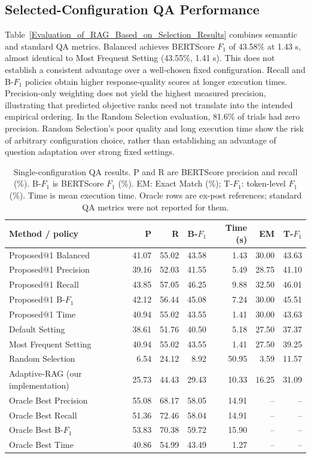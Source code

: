 \subsection{Selected-Configuration QA Performance} \label{sec5.2}
Table~\ref{Evaluation_of_RAG_Based_on_Selection_Results} combines semantic and standard QA metrics. Balanced achieves BERTScore $F_1$ of 43.58\% at 1.43 s, almost identical to Most Frequent Setting (43.55\%, 1.41 s). This does not establish a consistent advantage over a well-chosen fixed configuration. Recall and B-$F_1$ policies obtain higher response-quality scores at longer execution times. Precision-only weighting does not yield the highest measured precision, illustrating that predicted objective ranks need not translate into the intended empirical ordering. In the Random Selection evaluation, 81.6\% of trials had zero precision. Random Selection's poor quality and long execution time show the risk of arbitrary configuration choice, rather than establishing an advantage of question adaptation over strong fixed settings.

\begin{table}[tb]
\centering\small
\caption{Single-configuration QA results. P and R are BERTScore precision and recall (\%). B-$F_1$ is BERTScore $F_1$ (\%). EM: Exact Match (\%); T-$F_1$: token-level $F_1$ (\%). Time is mean execution time. Oracle rows are ex-post references; standard QA metrics were not reported for them.}
\label{Evaluation_of_RAG_Based_on_Selection_Results}
\label{Evaluation_of_RAG_Based_on_Standard_Metrics}
\begin{tabular}{lrrrrrr}
\toprule
Method / policy & P & R & B-$F_1$ & Time (s) & EM & T-$F_1$ \\
\midrule
Proposed@1 Balanced & 41.07 & 55.02 & 43.58 & 1.43 & 30.00 & 43.63 \\
Proposed@1 Precision & 39.16 & 52.03 & 41.55 & 5.49 & 28.75 & 41.10 \\
Proposed@1 Recall & 43.85 & 57.05 & 46.25 & 9.88 & 32.50 & 46.01 \\
Proposed@1 B-$F_1$ & 42.12 & 56.44 & 45.08 & 7.24 & 30.00 & 45.51 \\
Proposed@1 Time & 40.94 & 55.02 & 43.55 & 1.41 & 30.00 & 43.63 \\
\midrule
Default Setting & 38.61 & 51.76 & 40.50 & 5.18 & 27.50 & 37.37 \\
Most Frequent Setting & 40.94 & 55.02 & 43.55 & 1.41 & 27.50 & 39.25 \\
Random Selection & 6.54 & 24.12 & 8.92 & 50.95 & 3.59 & 11.57 \\
Adaptive-RAG (our implementation) & 25.73 & 44.43 & 29.43 & 10.33 & 16.25 & 31.09 \\
\midrule
Oracle Best Precision & 55.08 & 68.17 & 58.05 & 14.91 & -- & -- \\
Oracle Best Recall & 51.36 & 72.46 & 58.04 & 14.91 & -- & -- \\
Oracle Best B-$F_1$ & 53.83 & 70.38 & 59.72 & 15.90 & -- & -- \\
Oracle Best Time & 40.86 & 54.99 & 43.49 & 1.27 & -- & -- \\
\bottomrule
\end{tabular}
\end{table}

